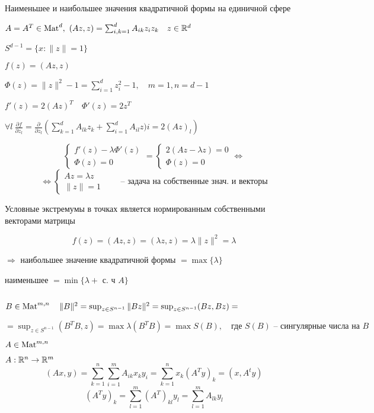     \begin{illustration}
        Наименьшее и наибольшее значения квадратичной формы на единичной сфере %
    \end{illustration}

    $A = A^T \in \operatorname{Mat}^d, \ (Az, z) = \sum_{i, k = 1}^d A_{ik} z_i z_k \quad z \in \mathbb{R}^d$
    \par $S^{d-1} = \{x : \|z\| = 1\}$
    \par $f(z) = (Az, z)$
    \par $\Phi(z) = \|z\|^2 - 1 = \sum_{i=1}^d z_i^2 - 1, \quad m = 1, n = d - 1$
    \par $f'(z) = 2(Az)^T \quad \Phi'(z) = 2z^T$
    \par $\forall l \ \frac{\partial f}{\partial z_l} = \frac{\partial}{\partial z_l}\left(\sum_{k=1}^d A_{lk}z_k + \sum_{i=1}^d A_{il} z)i = 2(Az)_l\right)$

    \[
        \begin{cases}
            f'(z) - \lambda \Phi'(z) \\
            \Phi(z) = 0
        \end{cases} = \begin{cases}
            2(Az - \lambda z) = 0 \\
            \Phi(z) = 0
        \end{cases} \Leftrightarrow
    \]
    \[
        \Leftrightarrow \begin{cases}
            Az = \lambda z \\
            \|z\| = 1
        \end{cases} \qquad \text{-- задача на собственные знач. и векторы}
    \]

    \begin{remark}
        Условные экстремумы в точках является нормированным собственными векторами матрицы
    \end{remark}

    \[
        f(z) = (Az, z) = (\lambda z, z) = \lambda \|z\|^2 = \lambda    
    \]

    $\Rightarrow$ наибольшее значение квадратичной формы $= \max\{\lambda\}$
    \par \quad наименьшее $= \min\{\lambda + \text{ с. ч } A\}$
    \par $ $
    \par $B \in \operatorname{Mat}^{m, n} \quad \|B\|^2 = \sup_{z \in S^{n-1}} \|Bz\|^2 = \sup_{z \in S^{n-1}} (Bz, Bz) =$
    \par $= \sup_{z \in S^{n-1}} (B^TB, z) = \max \lambda (B^TB) = \max S(B), \quad \text{где } S(B) \text{ -- сингулярные числа на } B$
    \par $A \in \operatorname{Mat}^{m, n}$
    \par $A : \mathbb{R}^n \rightarrow \mathbb{R}^m$
    \[
        (Ax, y) = \sum_{k=1}^n \sum_{i=1}^m A_{ik} x_k y_i = \sum_{k=1}^n x_k (A^Ty)_k = (x, A^ty) %
    \]
    \[
        (A^Ty)_k = \sum_{l=1}^m (A^T)_{kl}y_l = \sum_{l=1}^m A_{lk}y_l   
    \]

